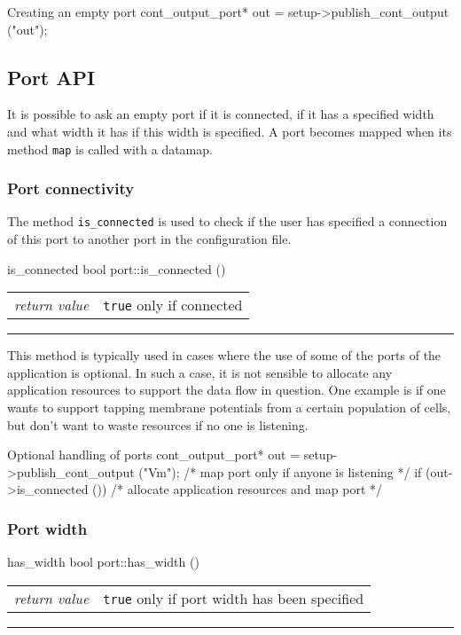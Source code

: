 \documentclass[a4paper]{report}
\makeatletter
\newenvironment{parameters}%
{\begin{tabular}{@{\hspace{2em}}lp{0.6\textwidth}}}%
{\end{tabular}\par\vspace{1mm}\par\hrule\par\vspace{5mm}}
\makeatother
\begin{document}
\begin{code}{Creating an empty port}
  cont_output_port* out = setup->publish_cont_output ("out");
\end{code}

\subsection{Port API}

It is possible to ask an empty port if it is connected, if it has a
specified width and what width it has if this width is specified.  A
port becomes mapped when its method \lstinline|map| is called with a
datamap.

\subsubsection{Port connectivity}

The method \lstinline|is_connected| is used to check if the user has
specified a connection of this port to another port in the
configuration file.

\begin{head}{is_connected}
  bool port::is_connected ()
\end{head}
\begin{parameters}
  \emph{return value} & \lstinline|true| only if connected\\
\end{parameters}

This method is typically used in cases where the use of some of the
ports of the application is optional.  In such a case, it is not
sensible to allocate any application resources to support the data
flow in question.  One example is if one wants to support tapping
membrane potentials from a certain population of cells, but don't want
to waste resources if no one is listening.

\begin{code}{Optional handling of ports}
  cont_output_port* out = setup->publish_cont_output ("Vm");
  /* map port only if anyone is listening */
  if (out->is_connected ())
    /* allocate application resources and map port */
\end{code}

\subsubsection{Port width}

\begin{head}{has_width}
  bool port::has_width ()
\end{head}
\begin{parameters}
  \emph{return value} & \lstinline|true| only if port width has been
                         specified \\
\end{parameters}
\end{document}
